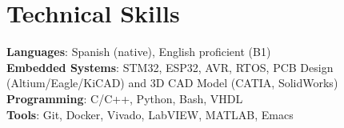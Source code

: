 \documentclass[letterpaper,11pt]{article}
\begin{document}
                                                                   \section{Technical Skills}
                                                                   \begin{itemize}[leftmargin=0.15in, label={}]
                                                                     \small{\item{
                                                                         \textbf{Languages}{: Spanish (native), English proficient (B1)} \\
                                                                         \textbf{Embedded Systems}{: STM32, ESP32, AVR, RTOS, PCB Design (Altium/Eagle/KiCAD) and 3D CAD Model (CATIA, SolidWorks)} \\
                                                                         \textbf{Programming}{: C/C++, Python, Bash, VHDL} \\
                                                                         \textbf{Tools}{: Git, Docker, Vivado, LabVIEW, MATLAB, Emacs} %
                                                                     }}
                                                                   \end{itemize}
\end{document}
